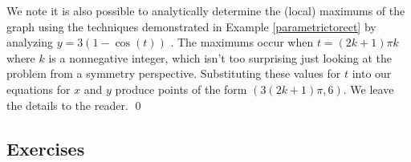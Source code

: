 \begin{ex}
\smallskip

We note it is also possible to analytically determine  the (local) maximums of the graph using the techniques demonstrated in Example \ref{parametrictorect}  by analyzing $y = 3(1-\cos(t))$ .   The maximums occur when $t = (2k +1) \pi k$ where $k$ is a nonnegative integer, which isn't too surprising just looking at the problem from a  symmetry perspective.  Substituting these values for $t$ into our equations for $x$ and $y$ produce points of the form $(3(2k+1) \pi, 6)$.  We leave the details to the reader.  \qed

\end{ex}



\newpage

\subsection{Exercises}




\closegraphsfile
